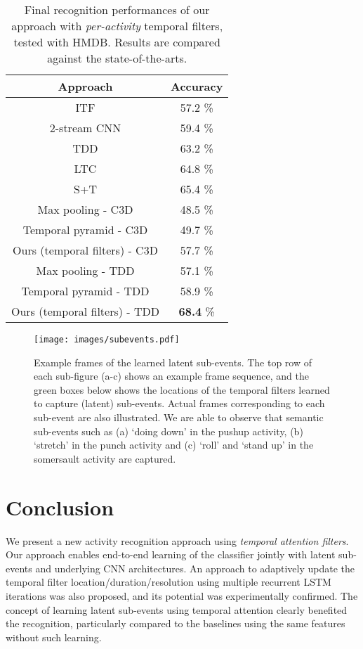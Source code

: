 \documentclass[letterpaper]{article}
\begin{document}
\begin{table}
    \small
	\caption{Final recognition performances of our approach with \emph{per-activity} temporal filters, tested with HMDB. Results are compared against the state-of-the-arts.}
	\label{table:hmdb-compare}

	\center
	\setlength\extrarowheight{0pt}
		\begin{tabular}	{c|c}
			\hline 	Approach & Accuracy \tabularnewline
			\hline 	
			        ITF \cite{wang13}	& 	57.2 \%  \tabularnewline
			        2-stream CNN \cite{simonyan14}	& 	59.4 \%  \tabularnewline
			        TDD \cite{tdd15} &   63.2 \%  \tabularnewline
			        LTC \cite{varol16} &   64.8 \%  \tabularnewline
S+T \cite{feichtenhofer2016} &   65.4 \%  \tabularnewline
\hline
			        Max pooling - C3D   &  48.5 \%   \tabularnewline
			        Temporal pyramid - C3D    &  49.7 \%   \tabularnewline
			        Ours (temporal filters) - C3D   &  57.7 \%   \tabularnewline
			        \hline
			        Max pooling - TDD   &  57.1 \%   \tabularnewline
			        Temporal pyramid - TDD    &   58.9 \%   \tabularnewline
					Ours (temporal filters) - TDD	&   \textbf{68.4} \%  \tabularnewline
			\hline
		\end{tabular}
\end{table}


\begin{figure*}[!tbp]
    \begin{center}
        \texttt{[image: images/subevents.pdf]}
    \end{center}
    \vspace{-20pt}
   \caption{Example frames of the learned latent sub-events. The top row of each sub-figure (a-c) shows an example frame sequence, and the green boxes below shows the locations of the temporal filters learned to capture (latent) sub-events. Actual frames corresponding to each sub-event are also illustrated. We are able to observe that semantic sub-events such as (a) `doing down' in the pushup activity, (b) `stretch' in the punch activity and (c) `roll' and `stand up' in the somersault activity are captured.}
\label{fig:subevent_example}		
\end{figure*}

\section{Conclusion}

We present a new activity recognition approach using \emph{temporal attention filters}. Our approach enables end-to-end learning of the classifier jointly with latent sub-events and underlying CNN architectures. An approach to adaptively update the temporal filter location/duration/resolution using multiple recurrent LSTM iterations was also proposed, and its potential was experimentally confirmed. The concept of learning latent sub-events using temporal attention clearly benefited the recognition, particularly compared to the baselines using the same features without such learning.
\end{document}
